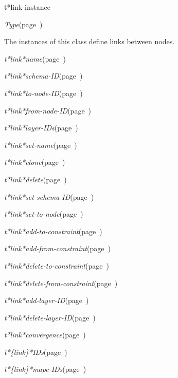 \begin{description}
\item [Name:]  t*link-instance

\item [Layer:] {\sl Type}\hfill(page~\pageref{Type})

\item [Description:]

The instances of this class define links between nodes. 

\item [Attributes:]
\item {\sl t*link*name}\hfill(page~\pageref{t*link*name})
\item {\sl t*link*schema-ID}\hfill(page~\pageref{t*link*schema-ID})
\item {\sl t*link*to-node-ID}\hfill(page~\pageref{t*link*to-node-ID})
\item {\sl t*link*from-node-ID}\hfill(page~\pageref{t*link*from-node-ID})
\item {\sl t*link*layer-IDs}\hfill(page~\pageref{t*link*layer-IDs})

\item [Operations:]
\item {\sl t*link*set-name}\hfill(page~\pageref{t*link*set-name})
\item {\sl t*link*clone}\hfill(page~\pageref{t*link*clone})
\item {\sl t*link*delete}\hfill(page~\pageref{t*link*delete})
\item {\sl t*link*set-schema-ID}\hfill(page~\pageref{t*link*set-schema-ID})
\item {\sl t*link*set-to-node}\hfill(page~\pageref{t*link*set-to-node})
\item {\sl t*link*add-to-constraint}\hfill(page~\pageref{t*link*add-to-constraint})
\item {\sl t*link*add-from-constraint}\hfill(page~\pageref{t*link*add-from-constraint})
\item {\sl t*link*delete-to-constraint}\hfill(page~\pageref{t*link*delete-to-constraint})
\item {\sl t*link*delete-from-constraint}\hfill(page~\pageref{t*link*delete-from-constraint})
\item {\sl t*link*add-layer-ID}\hfill(page~\pageref{t*link*add-layer-ID})
\item {\sl t*link*delete-layer-ID}\hfill(page~\pageref{t*link*delete-layer-ID})
\item {\sl t*link*convergence}\hfill(page~\pageref{t*link*convergence})

\item {\sl t*\{link\}*IDs}\hfill(page~\pageref{t*link*IDs})
\item {\sl t*\{link\}*mapc-IDs}\hfill(page~\pageref{t*link*mapc-IDs})

\item [Subclasses:]


\item [Superclasses:]


\item [Instances:]



\end{description}
\horizontalline

